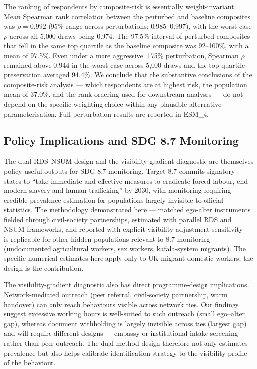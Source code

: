 \documentclass[
  12pt,
  letterpaper,
  DIV=11,
  numbers=noendperiod]{scrartcl}
\begin{document}
The ranking of respondents by composite-risk is essentially
weight-invariant. Mean Spearman rank correlation between the perturbed
and baseline composites was \(\rho = 0.992\) (95\% range across
perturbations: 0.985--0.997), with the worst-case \(\rho\) across all
5,000 draws being 0.974. The 97.5\% interval of perturbed composites
that fell in the same top quartile as the baseline composite was
92--100\%, with a mean of 97.5\%. Even under a more aggressive ±75\%
perturbation, Spearman \(\rho\) remained above 0.944 in the worst case
across 5,000 draws and the top-quartile preservation averaged 94.4\%. We
conclude that the substantive conclusions of the composite-risk analysis
--- which respondents are at highest risk, the population mean of
37.0\%, and the rank-ordering used for downstream analyses --- do not
depend on the specific weighting choice within any plausible alternative
parameterisation. Full perturbation results are reported in ESM\_4.

\subsection{Policy Implications and SDG 8.7
Monitoring}\label{sec-policy}

The dual RDS--NSUM design and the visibility-gradient diagnostic are
themselves policy-useful outputs for SDG 8.7 monitoring. Target 8.7
commits signatory states to ``take immediate and effective measures to
eradicate forced labour, end modern slavery and human trafficking'' by
2030, with monitoring requiring credible prevalence estimation for
populations largely invisible to official statistics. The methodology
demonstrated here --- matched ego-alter instruments fielded through
civil-society partnerships, estimated with parallel RDS and NSUM
frameworks, and reported with explicit visibility-adjustment sensitivity
--- is replicable for other hidden populations relevant to 8.7
monitoring (undocumented agricultural workers, sex workers,
kafala-system migrants). The specific numerical estimates here apply
only to UK migrant domestic workers; the design is the contribution.

The visibility-gradient diagnostic also has direct programme-design
implications. Network-mediated outreach (peer referral, civil-society
partnership, warm handover) can only reach behaviours visible across
network ties. Our findings suggest excessive working hours is
well-suited to such outreach (small ego--alter gap), whereas document
withholding is largely invisible across ties (largest gap) and will
require different designs --- embassy or institutional intake screening
rather than peer outreach. The dual-method design therefore not only
estimates prevalence but also helps calibrate identification strategy to
the visibility profile of the behaviour.
\end{document}
